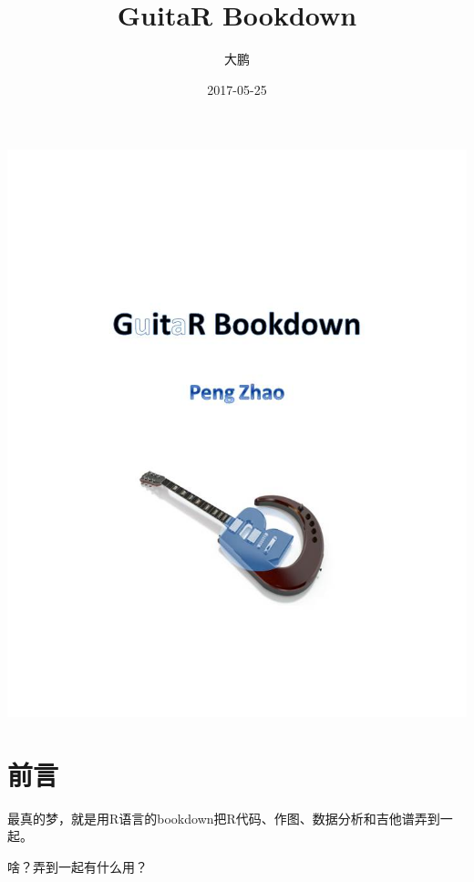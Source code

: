 \documentclass[openany]{ctexbook}
\title{GuitaR Bookdown}
\author{大鹏}
\date{2017-05-25}
\newcommand\mychords{
\def\chordsize{1.6mm}   %
\font\fingerfont=cmr5  %
\font\namefont=cmr10    %
\font\fretposfont=cmr7  %
\def\dampsymbol{{\tiny$\scriptstyle\times$}} %
}
\theoremstyle{definition}
\theoremstyle{definition}
\theoremstyle{remark}
\begin{document}
%
\begin{titlepage}
    \centering
    \includegraphics[width=\textwidth]{images/cover.jpg}
\end{titlepage}


\thispagestyle{empty}

\setlength{\abovedisplayskip}{-5pt}
\setlength{\abovedisplayshortskip}{-5pt}


{
\setcounter{tocdepth}{1}
\tableofcontents
}
\chapter*{前言}\label{front}

最真的梦，就是用R语言的bookdown把R代码、作图、数据分析和吉他谱弄到一起。

啥？弄到一起有什么用？
\end{document}
